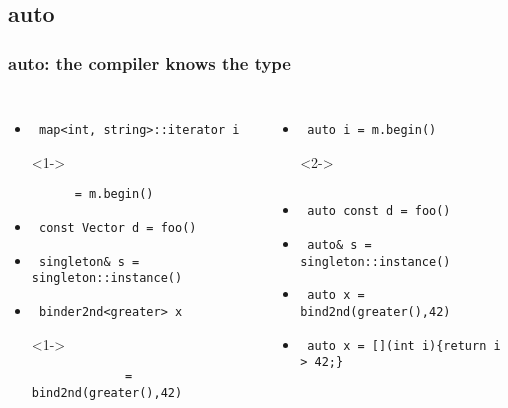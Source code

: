 
\subsection{auto}
\lyxframeend{}


\begin{frame}[fragile]
\frametitle{auto: the compiler knows the type}

\begin{columns}[t]
{\scriptsize
\begin{itemize}
\item  <1->\begin{verbatim} map<int, string>::iterator i   \end{verbatim}
\item[]<1->\begin{verbatim}      = m.begin()\end{verbatim}
\item<1->\begin{verbatim} const Vector d = foo() \end{verbatim}
\item<1->\begin{verbatim} singleton& s = singleton::instance() \end{verbatim}
\item  <1->\begin{verbatim} binder2nd<greater> x   \end{verbatim}
\item[]<1->\begin{verbatim}             = bind2nd(greater(),42) \end{verbatim}
\end{itemize}
}
{\scriptsize
\begin{itemize}
\item<2->\begin{verbatim} auto i = m.begin() \end{verbatim}
\item[]<2->\begin{verbatim}  \end{verbatim}
\item<2->\begin{verbatim} auto const d = foo() \end{verbatim}
\item<2->\begin{verbatim} auto& s = singleton::instance() \end{verbatim}
\item<2->\begin{verbatim} auto x = bind2nd(greater(),42) \end{verbatim}
\item<3->\begin{verbatim} auto x = [](int i){return i > 42;} \end{verbatim}
\end{itemize}
}
\end{columns}
\vskip 24pt


\end{frame}
